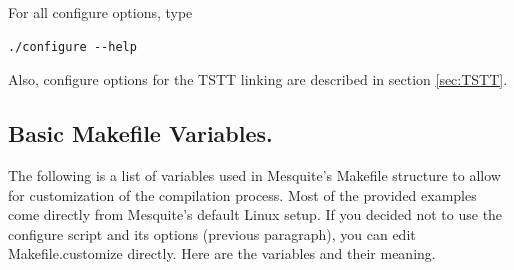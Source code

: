 \documentclass[letter]{report}
\begin{document}
For all configure options, type
\begin{verbatim}
./configure --help
\end{verbatim}
Also, configure options for the TSTT linking are described in section \ref{sec:TSTT}.



\subsection{Basic Makefile Variables.}  \label{mes_vars_and_defs}

The following is a list of variables used in Mesquite's Makefile
structure to allow for customization of the compilation process.
Most of the provided examples come directly from Mesquite's default
Linux setup. If you decided not to use the configure script and its options (previous paragraph),
you can edit Makefile.customize directly. Here are the variables and their meaning.
\end{document}
